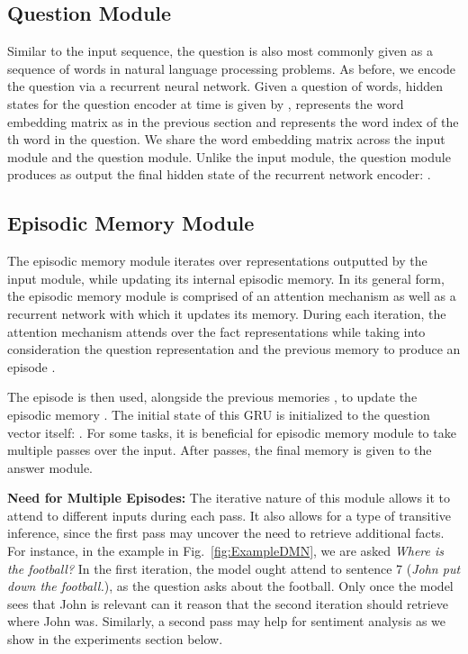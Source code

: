 \documentclass{article}
\begin{document}
\subsection{Question Module}

Similar to the input sequence, the question is also most commonly given as a sequence of words in natural language processing problems. As before, we encode the question via a recurrent neural network. Given a question of  words, hidden states for the question encoder at time  is given by ,   represents the word embedding matrix as in the previous section and  represents the word index of the th word in the question. We share the word embedding matrix across the input module and the question module. Unlike the input module, the question module produces as output the final hidden state of the recurrent network encoder: .


\subsection{Episodic Memory Module}
The episodic memory module iterates over representations outputted by the input module, while updating its internal episodic memory. In its general form, the episodic memory module is comprised of an attention mechanism as well as a recurrent network with which it updates its memory. During each iteration, the attention mechanism attends over the fact representations  while taking into consideration the question representation  and the previous memory  to produce an episode . 

The episode is then used, alongside the previous memories , to update the episodic memory . The initial state of this GRU is initialized to the question vector itself: . For some tasks, it is beneficial for episodic memory module to take multiple passes over the input. After  passes, the final memory  is given to the answer module.
 
\textbf{Need for Multiple Episodes:}
The iterative nature of this module allows it to attend to different inputs during each pass. It also allows for a type of transitive inference, since the first pass may uncover the need to retrieve additional facts. For instance, in the example in Fig.~\ref{fig:ExampleDMN}, we are asked \emph{Where is the football?} In the first iteration, the model ought attend to sentence 7 (\emph{John put down the football.}), as the question asks about the football. Only once the model sees that John is relevant can it reason that the second iteration should retrieve where John was. Similarly, a second pass may help for sentiment analysis as we show in the experiments section below.
\end{document}
